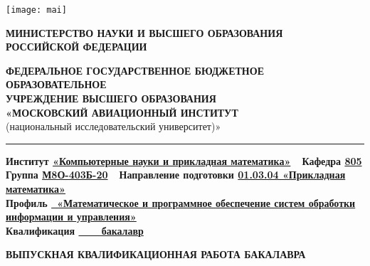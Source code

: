 \thispagestyle{empty}
\noindent
\begin{minipage}{0.2\textwidth}
    \texttt{[image: mai]}
\end{minipage}
\hfill
\begin{minipage}{0.8\textwidth}
    \centering
    \footnotesize
    \textbf{\footnotesize
    МИНИСТЕРСТВО НАУКИ И ВЫСШЕГО ОБРАЗОВАНИЯ\\
    РОССИЙСКОЙ ФЕДЕРАЦИИ}

    \vspace{1em}
    \textbf{\footnotesize
    ФЕДЕРАЛЬНОЕ ГОСУДАРСТВЕННОЕ БЮДЖЕТНОЕ ОБРАЗОВАТЕЛЬНОЕ\\ 
    УЧРЕЖДЕНИЕ ВЫСШЕГО ОБРАЗОВАНИЯ\\ 
    «МОСКОВСКИЙ АВИАЦИОННЫЙ ИНСТИТУТ}\\ 
    (национальный исследовательский университет)»
\end{minipage}

\noindent\rule{\textwidth}{1.5pt}

{
    \small
    \noindent\textbf{Институт \urule\uline{«Компьютерные науки и прикладная математика»}\urule\ \ Кафедра \urule\uline{805}\urule}\\
    \noindent\textbf{Группа \urule\uline{М8О-403Б-20}\urule\ \ Направление подготовки \urule\uline{01.03.04 «Прикладная математика»}\urule}\\ 
    \noindent\textbf{Профиль \uline{\ «Математическое и программное обеспечение систем обработки информации и управления»}\urule}\\ 
    \noindent\textbf{Квалификация \uline{\ \ \ \ бакалавр}\urule}
}

\begin{center}
    \textbf{ВЫПУСКНАЯ КВАЛИФИКАЦИОННАЯ РАБОТА БАКАЛАВРА}
\end{center}


